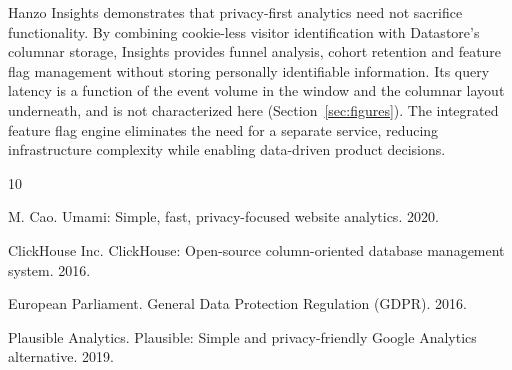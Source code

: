 \documentclass[11pt,twocolumn]{article}
\begin{document}
Hanzo Insights demonstrates that privacy-first analytics need not sacrifice functionality. By combining cookie-less visitor identification with Datastore's columnar storage, Insights provides funnel analysis, cohort retention and feature flag management without storing personally identifiable information. Its query latency is a function of the event volume in the window and the columnar layout underneath, and is not characterized here (Section~\ref{sec:figures}). The integrated feature flag engine eliminates the need for a separate service, reducing infrastructure complexity while enabling data-driven product decisions.


\begin{thebibliography}{10}

M. Cao. Umami: Simple, fast, privacy-focused website analytics. 2020.

ClickHouse Inc. ClickHouse: Open-source column-oriented database management system. 2016.

European Parliament. General Data Protection Regulation (GDPR). 2016.

Plausible Analytics. Plausible: Simple and privacy-friendly Google Analytics alternative. 2019.

\end{thebibliography}
\end{document}
